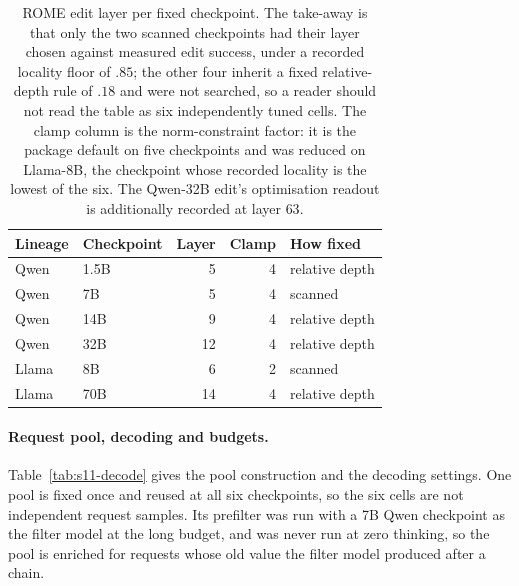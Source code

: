 \documentclass[letterpaper]{article}
\begin{document}
\begin{table}[t]
\centering
\small
\begin{tabular}{@{}llrrl@{}}
\toprule
Lineage & Checkpoint & Layer & Clamp & How fixed \\
\midrule
Qwen  & 1.5B &  5 & 4 & relative depth \\
Qwen  & 7B   &  5 & 4 & scanned \\
Qwen  & 14B  &  9 & 4 & relative depth \\
Qwen  & 32B  & 12 & 4 & relative depth \\
Llama & 8B   &  6 & 2 & scanned \\
Llama & 70B  & 14 & 4 & relative depth \\
\bottomrule
\end{tabular}
\caption{ROME edit layer per fixed checkpoint.  The take-away is that only the
two scanned checkpoints had their layer chosen against measured edit success,
under a recorded locality floor of \(.85\); the other four
inherit a fixed relative-depth rule of \(.18\) and were not searched, so a
reader should not read the table as six independently tuned cells.  The clamp
column is the norm-constraint factor: it is the package default on five
checkpoints and was reduced on Llama-8B, the checkpoint whose recorded locality
is the lowest of the six.  The Qwen-32B edit's optimisation readout is
additionally recorded at layer \(63\).}
\label{tab:s11-edit}
\end{table}

\paragraph{Request pool, decoding and budgets.}
Table~\ref{tab:s11-decode} gives the pool construction and the decoding
settings.  One pool is fixed once and reused at all six checkpoints, so the six
cells are not independent request samples.  Its prefilter was run with a
7B Qwen checkpoint as the filter model at the long budget, and was never
run at zero thinking, so the pool is enriched for requests whose old value the
filter model produced after a chain.
\end{document}

